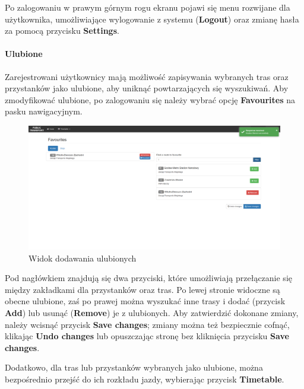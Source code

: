 \documentclass[10pt,a4paper]{article}
\begin{document}
Po zalogowaniu w prawym górnym rogu ekranu pojawi się menu rozwijane dla użytkownika, umożliwiające wylogowanie z systemu (\textbf{Logout}) oraz zmianę hasła za pomocą przycisku \textbf{Settings}.

\paragraph{Ulubione}
Zarejestrowani użytkownicy mają możliwość zapisywania wybranych tras oraz przystanków jako ulubione, aby uniknąć powtarzających się wyszukiwań. Aby zmodyfikować ulubione, po zalogowaniu się należy wybrać opcję \textbf{Favourites} na pasku nawigacyjnym.
\begin{figure}[H]
	\centering
	\includegraphics[width=15cm]{Resources/Images/32_favourites.png}
	\caption{Widok dodawania ulubionych}
\end{figure}
Pod nagłówkiem znajdują się dwa przyciski, które umożliwiają przełączanie się między zakładkami dla przystanków oraz tras. Po lewej stronie widoczne są obecne ulubione, zaś po prawej można wyszukać inne trasy i dodać (przycisk \textbf{Add}) lub usunąć (\textbf{Remove}) je z ulubionych. Aby zatwierdzić dokonane zmiany, należy wcisnąć przycisk \textbf{Save changes}; zmiany można też bezpiecznie cofnąć, klikając \textbf{Undo changes} lub opuszczając stronę bez kliknięcia przycisku \textbf{Save changes}.

Dodatkowo, dla tras lub przystanków wybranych jako ulubione, można bezpośrednio przejść do ich rozkładu jazdy, wybierając przycisk \textbf{Timetable}.
\end{document}
